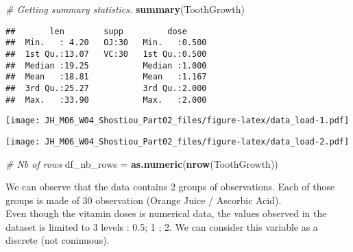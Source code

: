 \documentclass[
]{article}
\newenvironment{Shaded}{\begin{snugshade}}{\end{snugshade}}
\newcommand{\CommentTok}[1]{\textcolor[rgb]{0.56,0.35,0.01}{\textit{#1}}}
\newcommand{\DataTypeTok}[1]{\textcolor[rgb]{0.13,0.29,0.53}{#1}}
\newcommand{\KeywordTok}[1]{\textcolor[rgb]{0.13,0.29,0.53}{\textbf{#1}}}
\newcommand{\NormalTok}[1]{#1}
\newcommand{\OperatorTok}[1]{\textcolor[rgb]{0.81,0.36,0.00}{\textbf{#1}}}
\newcommand{\StringTok}[1]{\textcolor[rgb]{0.31,0.60,0.02}{#1}}
\begin{document}
\begin{Shaded}
\begin{Highlighting}[]
\CommentTok{# Getting summary statistics.}
\KeywordTok{summary}\NormalTok{(ToothGrowth)  }
\end{Highlighting}
\end{Shaded}

\begin{verbatim}
##       len        supp         dose      
##  Min.   : 4.20   OJ:30   Min.   :0.500  
##  1st Qu.:13.07   VC:30   1st Qu.:0.500  
##  Median :19.25           Median :1.000  
##  Mean   :18.81           Mean   :1.167  
##  3rd Qu.:25.27           3rd Qu.:2.000  
##  Max.   :33.90           Max.   :2.000
\end{verbatim}

\begin{Shaded}
\end{Shaded}

\texttt{[image: JH\_M06\_W04\_Shostiou\_Part02\_files/figure-latex/data\_load-1.pdf]}

\begin{Shaded}
\end{Shaded}

\texttt{[image: JH\_M06\_W04\_Shostiou\_Part02\_files/figure-latex/data\_load-2.pdf]}

\begin{Shaded}
\begin{Highlighting}[]
\CommentTok{# Nb of rows}
\NormalTok{df_nb_rows =}\StringTok{ }\KeywordTok{as.numeric}\NormalTok{(}\KeywordTok{nrow}\NormalTok{(ToothGrowth))}
\end{Highlighting}
\end{Shaded}

We can observe that the data contains 2 groups of observations. Each of
those groups is made of 30 observation (Orange Juice / Ascorbic Acid).\\
Even though the vitamin doses is numerical data, the values observed in
the dataset is limited to 3 levels : 0.5; 1 ; 2. We can consider this
variable as a discrete (not coninuous).
\end{document}
